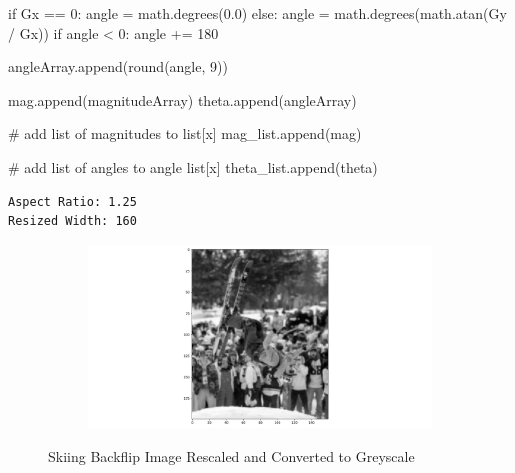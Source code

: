 \documentclass[
  letterpaper,
  DIV=11,
  numbers=noendperiod]{scrreprt}
\newenvironment{Shaded}{\begin{snugshade}}{\end{snugshade}}
\newcommand{\BuiltInTok}[1]{\textcolor[rgb]{0.00,0.23,0.31}{#1}}
\newcommand{\CommentTok}[1]{\textcolor[rgb]{0.37,0.37,0.37}{#1}}
\newcommand{\ControlFlowTok}[1]{\textcolor[rgb]{0.00,0.23,0.31}{#1}}
\newcommand{\DecValTok}[1]{\textcolor[rgb]{0.68,0.00,0.00}{#1}}
\newcommand{\FloatTok}[1]{\textcolor[rgb]{0.68,0.00,0.00}{#1}}
\newcommand{\NormalTok}[1]{\textcolor[rgb]{0.00,0.23,0.31}{#1}}
\newcommand{\OperatorTok}[1]{\textcolor[rgb]{0.37,0.37,0.37}{#1}}
\begin{document}
\begin{Shaded}
\begin{Highlighting}[]
            \ControlFlowTok{if}\NormalTok{ Gx }\OperatorTok{==} \DecValTok{0}\NormalTok{:}
\NormalTok{                angle }\OperatorTok{=}\NormalTok{ math.degrees(}\FloatTok{0.0}\NormalTok{)}
            \ControlFlowTok{else}\NormalTok{:}
\NormalTok{                angle }\OperatorTok{=}\NormalTok{ math.degrees(math.atan(Gy }\OperatorTok{/}\NormalTok{ Gx))}
                \ControlFlowTok{if}\NormalTok{ angle }\OperatorTok{\textless{}} \DecValTok{0}\NormalTok{:}
\NormalTok{                    angle }\OperatorTok{+=} \DecValTok{180}

\NormalTok{            angleArray.append(}\BuiltInTok{round}\NormalTok{(angle, }\DecValTok{9}\NormalTok{))}

\NormalTok{        mag.append(magnitudeArray)}
\NormalTok{        theta.append(angleArray)}

    \CommentTok{\# add list of magnitudes to list[x]}
\NormalTok{    mag\_list.append(mag)}

    \CommentTok{\# add list of angles to angle list[x]}
\NormalTok{    theta\_list.append(theta)}
\end{Highlighting}
\end{Shaded}

\begin{verbatim}
Aspect Ratio: 1.25
Resized Width: 160
\end{verbatim}

\begin{figure}

\begin{minipage}{\linewidth}

\begin{figure}[H]

{\centering \includegraphics{images/plots/backflip/0.jpg}

}


\end{figure}%

\end{minipage}%

\caption{\label{fig-flip}Skiing Backflip Image Rescaled and Converted to
Greyscale}

\end{figure}%
\end{document}
